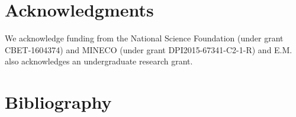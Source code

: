 \begin{refsection}[referencesCh2]
\vspace{-0.8cm}
\begingroup     
\let\clearpage\relax
%

%
\glsaddall
\setlength\LTleft{0pt}
\setlength\LTright{0pt}
\setlength\glsdescwidth{0.8\hsize}
\renewcommand*{\glossarypreamble}{\vspace{-0.8cm}}
\printglossary[type=SetsCh2, style=long]
\vspace{10pt}
\printglossary[type=ParamCh2, style=long]
\vspace{10pt}
\printglossary[type=VarCh2, style=long]
\endgroup

\section*{Acknowledgments} \label{section:Acknowledgments}
We acknowledge funding from the National Science Foundation (under grant CBET-1604374) and MINECO (under grant DPI2015-67341-C2-1-R) and E.M. also acknowledges an undergraduate research grant.

\section*{Bibliography}

\printbibliography[heading=none]
\end{refsection}

